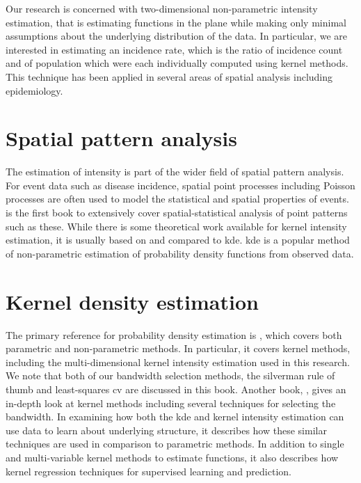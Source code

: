 

Our research is concerned with two-dimensional non-parametric intensity estimation,
that is estimating functions in the plane while making only minimal assumptions about the underlying distribution of the data. 
In particular, we are interested in estimating an incidence rate,
which is the ratio of incidence count and of population which were each individually computed using kernel methods.
This technique has been applied in several areas of spatial analysis including epidemiology.

\section{Spatial pattern analysis}

The estimation of intensity is part of the wider field of spatial pattern analysis.
For event data such as disease incidence,
spatial point processes including Poisson processes are often used to model the statistical and spatial properties of events.
 is the first book to extensively cover spatial-statistical analysis of point patterns such as these.
While there is some theoretical work available for \gls{kernel intensity estimation},
it is usually based on and compared to \acrfull{kde}.
\Gls{kde} is a popular method of non-parametric estimation of probability density functions from observed data.

\section{Kernel density estimation}
 
The primary reference for probability density estimation is \citep{silverman1986density},
which covers both parametric and non-parametric methods.
In particular,
it covers kernel methods,
including the multi-dimensional \gls{kernel intensity estimation} used in this research.
We note that both of our bandwidth selection methods,
the \Gls{silverman} rule of thumb and least-squares \acrlong{cv} are discussed in this book.
Another book, \citet{wand1994kernel}, gives an in-depth look at kernel methods
including several techniques for selecting the bandwidth.
In examining how both the \gls{kde} and \gls{kernel intensity estimation} can use data to learn about underlying structure,
it describes how these similar techniques are used in comparison to parametric methods.
In addition to single and multi-variable kernel methods to estimate functions,
it also describes how kernel regression techniques for supervised learning and prediction.

